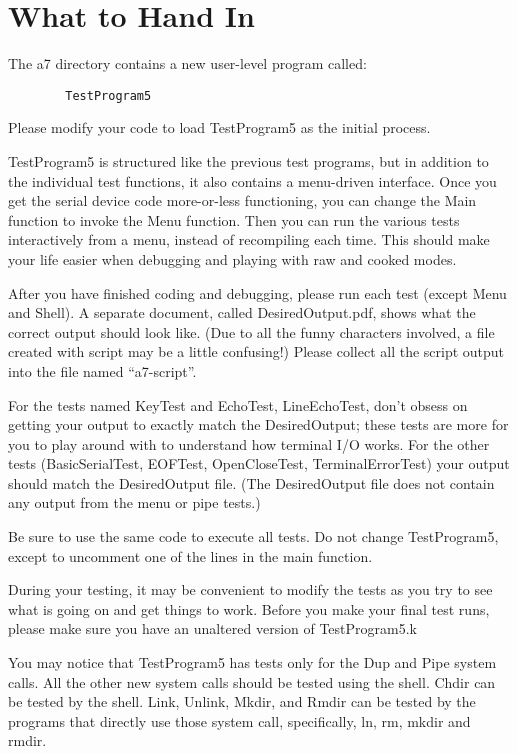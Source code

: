 \documentclass[11pt]{article}
\begin{document}
\section{What to Hand In}

The a7 directory contains a new user-level program called:

\begin{verbatim}
        TestProgram5
\end{verbatim}

Please modify your code to load TestProgram5 as the initial process.

TestProgram5 is structured like the previous test programs, but in
addition to the individual test functions, it also contains a
menu-driven interface.  Once you get the serial device code
more-or-less functioning, you can change the Main function to invoke
the Menu function.  Then you can run the various tests interactively
from a menu, instead of recompiling each time.  This should make your
life easier when debugging and playing with raw and cooked modes.

After you have finished coding and debugging, please run each test
(except Menu and Shell).  A separate document, called
DesiredOutput.pdf, shows what the correct output should look like.
(Due to all the funny characters involved, a file created with script
may be a little confusing!)  Please collect all the script output into
the file named ``a7-script''.

For the tests named KeyTest and EchoTest, LineEchoTest, don't obsess
on getting your output to exactly match the DesiredOutput; these tests
are more for you to play around with to understand how terminal I/O
works.  For the other tests (BasicSerialTest, EOFTest, OpenCloseTest,
TerminalErrorTest) your output should match the DesiredOutput file.
(The DesiredOutput file does not contain any output from the menu or
pipe tests.)

Be sure to use the same code to execute all tests. Do not change
TestProgram5, except to uncomment one of the lines in the main
function.

During your testing, it may be convenient to modify the tests as you
try to see what is going on and get things to work.  Before you make
your final test runs, please make sure you have an unaltered version
of TestProgram5.k

You may notice that TestProgram5 has tests only for the Dup and Pipe
system calls.  All the other new system calls should be tested using
the shell.  Chdir can be tested by the shell.  Link, Unlink, Mkdir,
and Rmdir can be tested by the programs that directly use those
system call, specifically, ln, rm, mkdir and rmdir.
\end{document}

